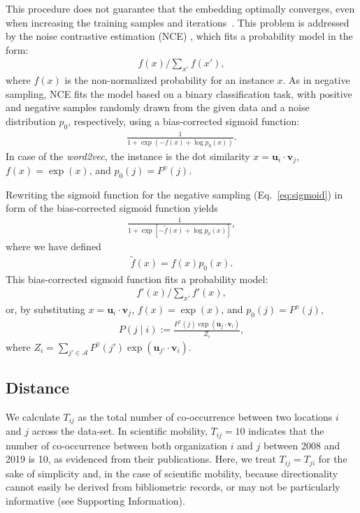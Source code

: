 \documentclass[12pt]{article} %
\def\given{\mid}
\def\SI{Supporting Information}
\begin{document}
This procedure does not guarantee that the embedding optimally converges, even when increasing the training samples and iterations~\autocite{Chia2010,Dyer2014}.
This problem is addressed by the noise contrastive estimation (NCE) \autocite{Chia2010}, which fits a probability model in the form:
\begin{align}
	\label{eq:nce}
	f(x) / \sum_{x'} f(x'),
\end{align}
where $f(x)$ is the non-normalized probability for an instance $x$.
As in negative sampling, NCE fits the model based on a binary classification task, with positive and negative samples randomly drawn from the given data and a noise distribution $p_0$, respectively, using a bias-corrected sigmoid function:
\begin{align}
	\label{eq:sigmoid2}
	\frac{1}{1 + \exp\left( -f(x) + \log p_0(x) \right)}.
\end{align}
In case of the {\it word2vec}, the instance is the dot similarity $x=\bm{u}_i \cdot \bm{v}_j$,  $f(x)=\exp(x)$, and $p_0(j)=P^\gamma(j)$.

Rewriting the sigmoid function for the negative sampling (Eq.~\eqref{eq:sigmoid}) in form of the bias-corrected sigmoid function yields
\begin{align}
	\label{eq:sigmoid3}
	\frac{1}{1 + \exp\left[ - \tilde f(x) + \log p_0(x)  \right]},
\end{align}
where we have defined
\begin{align}
	\label{eq:unnormalized}
	\tilde f(x) = f(x) p_0(x).
\end{align}
This bias-corrected sigmoid function fits a probability model:
\begin{align}
	f'(x) / \sum_{x'} f'(x),
\end{align}
or, by substituting $x=\bm{u}_i \cdot \bm{v}_j$, $f(x)=\exp(x)$, and $p_0(j)=P^\gamma (j)$,
\begin{align}
	P\left(j \given i \right):= \frac{P^\gamma (j)\exp(\bm{u}_j \cdot \bm{v}_{i})}{Z_i},
\end{align}
where $Z_i=\sum_{j' \in \mathcal{A}} P^\gamma (j') \exp(\bm{u}_{j'} \cdot \bm{v}_{i})$.


%
%
\subsection*{Distance}
We calculate $T_{ij}$ as the total number of co-occurrence between two locations $i$ and $j$ across the data-set.
In scientific mobility, $T_{ij} = 10$ indicates that the number of co-occurrence between both organization $i$ and $j$ between 2008 and 2019 is 10, as evidenced from their publications.
Here, we treat $T_{ij} = T_{ji}$ for the sake of simplicity and, in the case of scientific mobility, because directionality cannot easily be derived from bibliometric records, or may not be particularly informative (see \SI).
\end{document}
